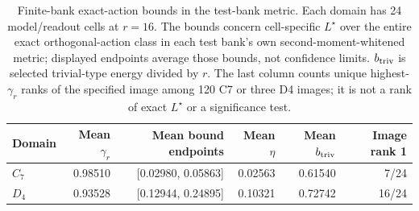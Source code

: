 \begin{table}[H]
\caption{Finite-bank exact-action bounds in the test-bank metric. Each domain has 24 model/readout cells at $r=16$. The bounds concern cell-specific $L^\star$ over the entire exact orthogonal-action class in each test bank's own second-moment-whitened metric; displayed endpoints average those bounds, not confidence limits. $b_{\rm triv}$ is selected trivial-type energy divided by $r$. The last column counts unique highest-$\gamma_r$ ranks of the specified image among 120 C7 or three D4 images; it is not a rank of exact $L^\star$ or a significance test.}
\label{tab:followup-spectral}
\centering\small
\begin{tabular}{@{}lrrrrr@{}}
\toprule
Domain & Mean $\gamma_r$ & Mean bound endpoints & Mean $\eta$ & Mean $b_{\rm triv}$ & Image rank 1 \\
\midrule
$C_7$ & 0.98510 & [0.02980, 0.05863] & 0.02563 & 0.61540 & 7/24 \\
$D_4$ & 0.93528 & [0.12944, 0.24895] & 0.10321 & 0.72742 & 16/24 \\
\bottomrule
\end{tabular}
\end{table}
